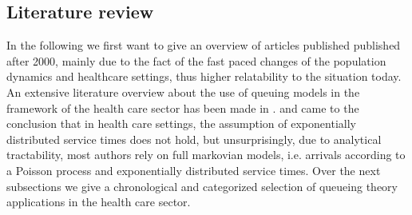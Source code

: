 \documentclass[11pt,a4paper]{article}
\begin{document}
\begin{spacing}{1.8}
\subsection{Literature review}
In the following we first want to give an overview of articles published  published after 2000, mainly due to the fact  of the fast paced changes of the population dynamics and healthcare settings, thus higher relatability to the situation today.
An extensive literature overview about the use of queuing models in the framework of the health care sector has been made in \citet{Lakshmi2013}.
\citet{Brahimi1991} and \citet{Dittus1996} came to the conclusion that in health care settings, the assumption of exponentially 
distributed service times does not hold, but unsurprisingly, due to analytical tractability, most authors rely on full markovian models, i.e. arrivals according to a Poisson process and exponentially distributed service times. 
Over the next subsections we give a chronological and categorized selection of queueing theory applications in the health care sector.


\end{spacing}
\end{document}
